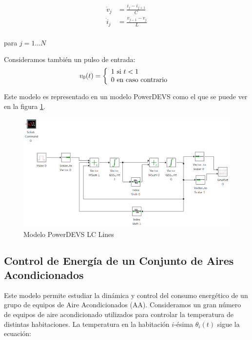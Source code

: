 \documentclass[a4paper,	11pt]{report}
\begin{document}
\begin{equation*}
\begin{split}
\dot{v}_{j} &= \frac{i_{j} - i_{j+1}}{C} \\
\dot{i}_{j} &= \frac{v_{j-1} - v_{j}}{L} \\	
\end{split}
\end{equation*}

para $j = 1 \dots N$

Consideramos también un pulso de entrada:
\begin{equation}
v_0(t) = \left\{ 
  \begin{array}{l l}
    1 \text{ si } t < 1 \\
    0 \text{ en caso contrario }
  \end{array} \right.
\end{equation}

Este modelo es representado en un modelo PowerDEVS como el que se puede ver en la figura \ref{fig:lclines}.

\begin{figure}[!htbp]
  \includegraphics[scale=0.40]{lclines}
  \caption{Modelo PowerDEVS LC Lines }
   \label{fig:lclines}
\end{figure}

\subsection{Control de Energía de un Conjunto de Aires Acondicionados}
Este modelo permite estudiar la dinámica y control del consumo energético de un grupo de equipos de Aire Acondicionados (AA). Consideramos un gran número de equipos de aire acondicionado utilizados para controlar la temperatura de distintas habitaciones. La temperatura en la habitación $i$-ésima $\theta_i(t)$ sigue la ecuación:
\end{document}
